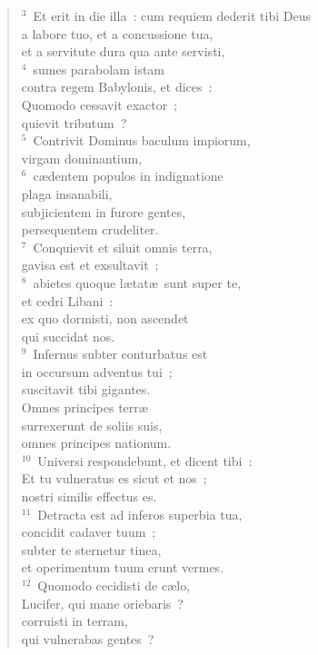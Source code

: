 \begin{verse}${}^{3}$~Et erit in die illa~: cum requiem dederit tibi Deus\\ a labore tuo, et a concussione tua,\\ et a servitute dura qua ante servisti,\\
${}^{4}$~sumes parabolam istam\\ contra regem Babylonis, et dices~:\\ Quomodo cessavit exactor~;\\ quievit tributum~?\\
${}^{5}$~Contrivit Dominus baculum impiorum,\\ virgam dominantium,\\
${}^{6}$~c\ae dentem populos in indignatione\\ plaga insanabili,\\ subjicientem in furore gentes,\\ persequentem crudeliter.\\
${}^{7}$~Conquievit et siluit omnis terra,\\ gavisa est et exsultavit~;\\
${}^{8}$~abietes quoque l\ae tat\ae\ sunt super te,\\ et cedri Libani~:\\ ex quo dormisti, non ascendet\\ qui succidat nos.\\
${}^{9}$~Infernus subter conturbatus est\\ in occursum adventus tui~;\\ suscitavit tibi gigantes.\\ Omnes principes terr\ae \\ surrexerunt de soliis suis,\\ omnes principes nationum.\\
${}^{10}$~Universi respondebunt, et dicent tibi~:\\ Et tu vulneratus es sicut et nos~;\\ nostri similis effectus es.\\
${}^{11}$~Detracta est ad inferos superbia tua,\\ concidit cadaver tuum~;\\ subter te sternetur tinea,\\ et operimentum tuum erunt vermes.\\
${}^{12}$~Quomodo cecidisti de c\ae lo,\\ Lucifer, qui mane oriebaris~?\\ corruisti in terram,\\ qui vulnerabas gentes~?\\

\end{verse}
